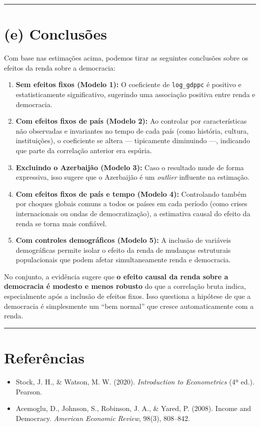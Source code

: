 \documentclass[
  portuguese,
  letterpaper,
  DIV=11,
  numbers=noendperiod]{scrartcl}
\providecommand{\tightlist}{%
  \setlength{\itemsep}{0pt}\setlength{\parskip}{0pt}}
\begin{document}
\begin{center}\rule{0.5\linewidth}{0.5pt}\end{center}

\section{(e) Conclusões}\label{e-conclusuxf5es}

Com base nas estimações acima, podemos tirar as seguintes conclusões
sobre os efeitos da renda sobre a democracia:

\begin{enumerate}
\def\labelenumi{\arabic{enumi}.}
\item
  \textbf{Sem efeitos fixos (Modelo 1):} O coeficiente de
  \texttt{log\_gdppc} é positivo e estatisticamente significativo,
  sugerindo uma associação positiva entre renda e democracia.
\item
  \textbf{Com efeitos fixos de país (Modelo 2):} Ao controlar por
  características não observadas e invariantes no tempo de cada país
  (como história, cultura, instituições), o coeficiente se altera ---
  tipicamente diminuindo ---, indicando que parte da correlação anterior
  era espúria.
\item
  \textbf{Excluindo o Azerbaijão (Modelo 3):} Caso o resultado mude de
  forma expressiva, isso sugere que o Azerbaijão é um \emph{outlier}
  influente na estimação.
\item
  \textbf{Com efeitos fixos de país e tempo (Modelo 4):} Controlando
  também por choques globais comuns a todos os países em cada período
  (como crises internacionais ou ondas de democratização), a estimativa
  causal do efeito da renda se torna mais confiável.
\item
  \textbf{Com controles demográficos (Modelo 5):} A inclusão de
  variáveis demográficas permite isolar o efeito da renda de mudanças
  estruturais populacionais que podem afetar simultaneamente renda e
  democracia.
\end{enumerate}

No conjunto, a evidência sugere que \textbf{o efeito causal da renda
sobre a democracia é modesto e menos robusto} do que a correlação bruta
indica, especialmente após a inclusão de efeitos fixos. Isso questiona a
hipótese de que a democracia é simplesmente um ``bem normal'' que cresce
automaticamente com a renda.

\begin{center}\rule{0.5\linewidth}{0.5pt}\end{center}

\section{Referências}\label{referuxeancias}

\begin{itemize}
\tightlist
\item
  Stock, J. H., \& Watson, M. W. (2020). \emph{Introduction to
  Econometrics} (4ª ed.). Pearson.
\item
  Acemoglu, D., Johnson, S., Robinson, J. A., \& Yared, P. (2008).
  Income and Democracy. \emph{American Economic Review}, 98(3),
  808--842.
\end{itemize}
\end{document}
